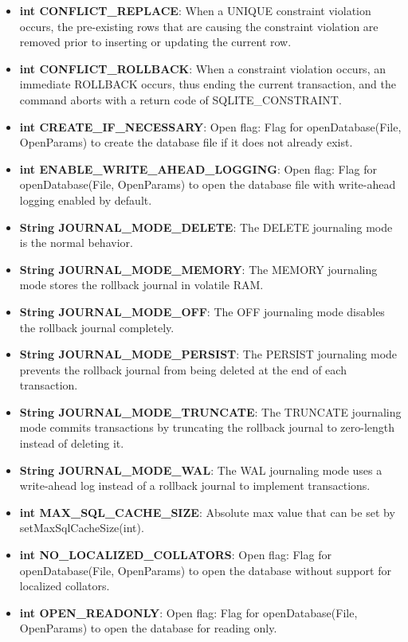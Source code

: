 \documentclass{report}
\begin{document}
\begin{itemize}
\begin{itemize}
\begin{itemize}
                \item \textbf{int	CONFLICT\_REPLACE}: When a UNIQUE constraint violation occurs, the pre-existing rows that are causing the constraint violation are removed prior to inserting or updating the current row.
                \item \textbf{int	CONFLICT\_ROLLBACK}: When a constraint violation occurs, an immediate ROLLBACK occurs, thus ending the current transaction, and the command aborts with a return code of SQLITE\_CONSTRAINT.
                \item \textbf{int	CREATE\_IF\_NECESSARY}: Open flag: Flag for openDatabase(File, OpenParams) to create the database file if it does not already exist.
                \item \textbf{int	ENABLE\_WRITE\_AHEAD\_LOGGING}: Open flag: Flag for openDatabase(File, OpenParams) to open the database file with write-ahead logging enabled by default.
                \item \textbf{String	JOURNAL\_MODE\_DELETE}: The DELETE journaling mode is the normal behavior.
                \item \textbf{String	JOURNAL\_MODE\_MEMORY}: The MEMORY journaling mode stores the rollback journal in volatile RAM.
                \item \textbf{String	JOURNAL\_MODE\_OFF}: The OFF journaling mode disables the rollback journal completely.
                \item \textbf{String	JOURNAL\_MODE\_PERSIST}: The PERSIST journaling mode prevents the rollback journal from being deleted at the end of each transaction.
                \item \textbf{String	JOURNAL\_MODE\_TRUNCATE}: The TRUNCATE journaling mode commits transactions by truncating the rollback journal to zero-length instead of deleting it.
                \item \textbf{String	JOURNAL\_MODE\_WAL}: The WAL journaling mode uses a write-ahead log instead of a rollback journal to implement transactions.
                \item \textbf{int	MAX\_SQL\_CACHE\_SIZE}: Absolute max value that can be set by setMaxSqlCacheSize(int).
                \item \textbf{int	NO\_LOCALIZED\_COLLATORS}: Open flag: Flag for openDatabase(File, OpenParams) to open the database without support for localized collators.
                \item \textbf{int	OPEN\_READONLY}: Open flag: Flag for openDatabase(File, OpenParams) to open the database for reading only.

\end{itemize}
\end{itemize}
\end{itemize}
\end{document}
